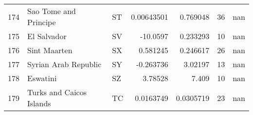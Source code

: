 \begin{tabular}{rllrrrr}
 174 & Sao Tome and Principe                                    & ST         &    0.00643501 &     0.769048  &     36 &          nan \\
 175 & El Salvador                                              & SV         &  -10.0597     &     0.233293  &     10 &          nan \\
 176 & Sint Maarten                                             & SX         &    0.581245   &     0.246617  &     26 &          nan \\
 177 & Syrian Arab Republic                                     & SY         &   -0.263736   &     3.02197   &     13 &          nan \\
 178 & Eswatini                                                 & SZ         &    3.78528    &     7.409     &     10 &          nan \\
 179 & Turks and Caicos Islands                                 & TC         &    0.0163749  &     0.0305719 &     23 &          nan \\
\hline
\end{tabular}